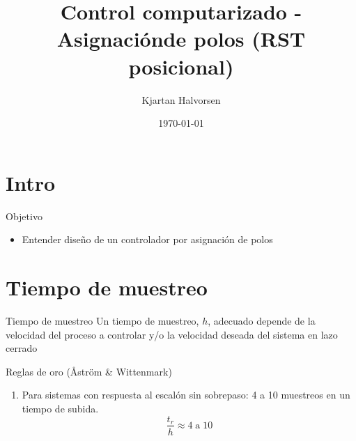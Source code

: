 \documentclass[presentation,aspectratio=169]{beamer}
\author{Kjartan Halvorsen}
\date{\today}
\title{Control computarizado - Asignaciónde polos (RST posicional)}
\begin{document}
\maketitle

\section{Intro}
\label{sec:org27fea70}

\begin{frame}[label={sec:orge4adfcc}]{Objetivo}
\begin{itemize}
\item Entender diseño de un controlador por asignación de polos
\end{itemize}
\end{frame}

\section{Tiempo de muestreo}
\label{sec:org928afef}
\begin{frame}[label={sec:org4a6af1d}]{Tiempo de muestreo}
\alert{Un tiempo de muestreo, \(h\), adecuado depende de la velocidad del proceso a controlar y/o la velocidad deseada del sistema en lazo cerrado}  
\begin{block}{Reglas de oro (Åström \& Wittenmark)}
\begin{enumerate}
\item Para sistemas con respuesta al escalón \alert{sin} sobrepaso: \alert{4 a 10} muestreos en un tiempo de subida. \[ \frac{t_r}{h} \approx 4 \; \text{a} \; 10 \]
\begin{center}
\def\TT{1}
\pgfmathsetmacro{\hh}{\TT/6}
\end{center}
\end{enumerate}
\end{block}
\end{frame}
\end{document}
